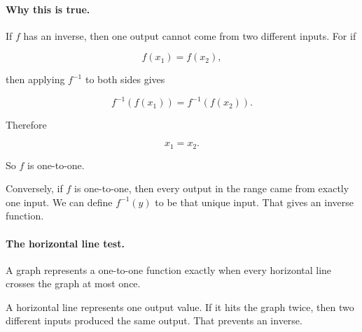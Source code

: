\paragraph{Why this is true.}
If \(f\) has an inverse, then one output cannot come from two different inputs. For if

\[
f(x_1)=f(x_2),
\]

then applying \(f^{-1}\) to both sides gives

\[
f^{-1}(f(x_1))=f^{-1}(f(x_2)).
\]

Therefore

\[
x_1=x_2.
\]

So \(f\) is one-to-one.

Conversely, if \(f\) is one-to-one, then every output in the range came from exactly one input. We can define \(f^{-1}(y)\) to be that unique input. That gives an inverse function.

\paragraph{The horizontal line test.}
A graph represents a one-to-one function exactly when every horizontal line crosses the graph at most once.

A horizontal line represents one output value. If it hits the graph twice, then two different inputs produced the same output. That prevents an inverse.

